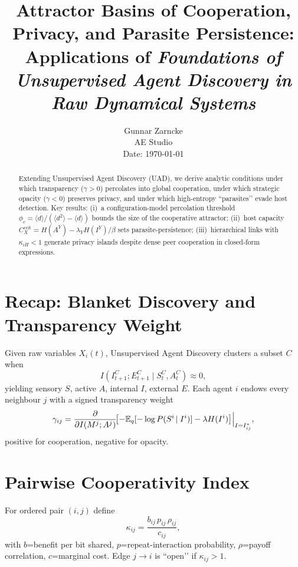 \documentclass[10pt,conference]{IEEEtran}
\title{Attractor Basins of Cooperation, Privacy, and Parasite Persistence:\\
Applications of \emph{Foundations of Unsupervised Agent Discovery in Raw Dynamical Systems}\footnotemark}
\author{Gunnar Zarncke\\
AE Studio\\
\small{Date: \today}}
\begin{document}
\maketitle
{}

\begin{abstract}
Extending Unsupervised Agent Discovery (UAD), we derive analytic conditions under which transparency (\(\gamma>0\)) percolates into global cooperation, under which strategic opacity (\(\gamma<0\)) preserves privacy, and under which high-entropy “parasites’’ evade host detection.  Key results: (i)~a configuration-model percolation threshold
\(\phi_c=\langle d\rangle/(\langle d^2\rangle-\langle d\rangle)\) bounds the size of the cooperative attractor; (ii)~host capacity \(C_X^{\mathrm{crit}}=H(A^Y)-\lambda_YH(I^Y)/\beta\) sets parasite-persistence; (iii)~hierarchical links with \(\kappa_{iH}<1\) generate privacy islands despite dense peer cooperation in closed-form expressions. 
\end{abstract}

\section{Recap: Blanket Discovery and Transparency Weight}

Given raw variables \(X_i(t)\), Unsupervised Agent Discovery  clusters a subset \(C\) when
\[
I(I^C_{t+1};E^C_{t+1}\mid S^C_t,A^C_t)\approx0,
\]
yielding sensory \(S\), active \(A\), internal \(I\), external \(E\).  
Each agent \(i\) endows every neighbour \(j\) with a signed transparency weight
\[
\gamma_{ij}
=\Bigl.\frac{\partial}{\partial I(M^j;A^j)}
\!\bigl[-\mathbb E_q[-\log P(S^i\!\mid I^i)]-\lambda H(I^i)\bigr]\Bigr|_{I=I^*_{ij}},
\]
positive for cooperation, negative for opacity.

\section{Pairwise Cooperativity Index}

For ordered pair \((i,j)\) define
\[
\kappa_{ij}=\frac{b_{ij}\,p_{ij}\,\rho_{ij}}{c_{ij}},
\]
with \(b\)=benefit per bit shared, \(p\)=repeat-interaction probability, \(\rho\)=payoff correlation, \(c\)=marginal cost.  
Edge \(j\!\to\! i\) is “open’’ if \(\kappa_{ij}>1\).  
\end{document}
